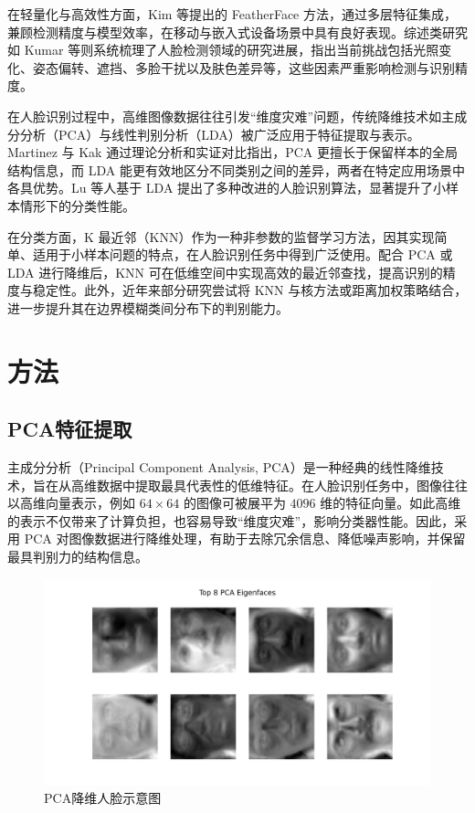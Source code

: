 \documentclass[a4paper, utf8]{ctexart}
\begin{document}
	在轻量化与高效性方面，Kim 等提出的 FeatherFace 方法，通过多层特征集成，兼顾检测精度与模型效率，在移动与嵌入式设备场景中具有良好表现\cite{mhfd2}。综述类研究如 Kumar 等则系统梳理了人脸检测领域的研究进展，指出当前挑战包括光照变化、姿态偏转、遮挡、多脸干扰以及肤色差异等，这些因素严重影响检测与识别精度​
	\cite{hfd}。
	
	在人脸识别过程中，高维图像数据往往引发“维度灾难”问题，传统降维技术如主成分分析（PCA）与线性判别分析（LDA）被广泛应用于特征提取与表示。Martinez 与 Kak 通过理论分析和实证对比指出，PCA 更擅长于保留样本的全局结构信息，而 LDA 能更有效地区分不同类别之间的差异，两者在特定应用场景中各具优势\cite{pcavslda}。Lu 等人基于 LDA 提出了多种改进的人脸识别算法，显著提升了小样本情形下的分类性能\cite{lda}。
	
	在分类方面，K 最近邻（KNN）作为一种非参数的监督学习方法，因其实现简单、适用于小样本问题的特点，在人脸识别任务中得到广泛使用。配合 PCA 或 LDA 进行降维后，KNN 可在低维空间中实现高效的最近邻查找，提高识别的精度与稳定性。此外，近年来部分研究尝试将 KNN 与核方法或距离加权策略结合，进一步提升其在边界模糊类间分布下的判别能力\cite{knn}。
	
	\section{方法}
	
	\subsection{PCA特征提取}
	
	主成分分析（Principal Component Analysis, PCA）是一种经典的线性降维技术，旨在从高维数据中提取最具代表性的低维特征。在人脸识别任务中，图像往往以高维向量表示，例如 $64 \times 64$ 的图像可被展平为 $4096$ 维的特征向量。如此高维的表示不仅带来了计算负担，也容易导致“维度灾难”，影响分类器性能。因此，采用 PCA 对图像数据进行降维处理，有助于去除冗余信息、降低噪声影响，并保留最具判别力的结构信息\cite{ml1, ml2, ml3, pca}。
	
	\begin{figure}[htbp]
		\centering
		\includegraphics[width=.8\textwidth]{./figure/PCAeigenfaces.png}
		\caption{PCA降维人脸示意图}
	\end{figure}
	
\end{document}

